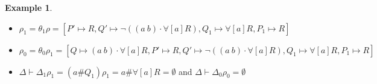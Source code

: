 \documentclass[submission,copyright,creativecommons]{eptcs}
\newcommand{\alert}[1]{\textcolor{red}{#1}}
\theoremstyle{plain}
\theoremstyle{definition}
\newtheorem{example}{Example}[section]
\theoremstyle{remark}
\begin{document}
\begin{example}
\begin{itemize}
        \item $\rho_1 = \theta_1\rho = [P' \mapsto R, Q'\mapsto \neg((a\ b)\cdot \forall[a]R), Q_1\mapsto \forall[a]R, P_1\mapsto R]$
        \item $\rho_0 = \theta_0\rho_1 = [Q\mapsto(a\ b)\cdot \forall[a]R, P' \mapsto R, Q'\mapsto \neg((a\ b)\cdot \forall[a]R), Q_1\mapsto \forall[a]R, P_1\mapsto R]$
        \item $\Delta\vdash \Delta_1\rho_1 = (a\#Q_1)\rho_1 = a\# \forall[a]R = \emptyset$ and  $\Delta\vdash \Delta_0\rho_0 = \emptyset$
    \end{itemize}
\end{example}

\end{document}
